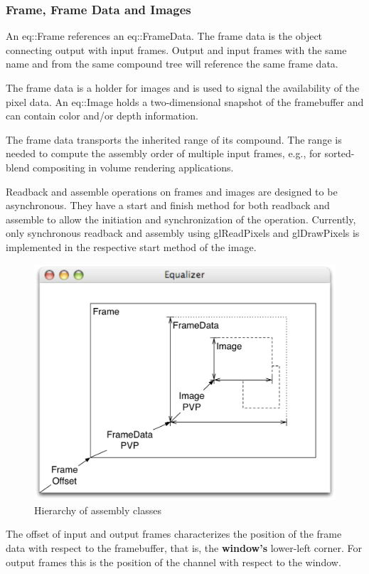 \documentclass[10pt,a4]{scrartcl}
\begin{document}
\subsubsection{Frame, Frame Data and Images}

An \textsf{eq::Frame} references an \textsf{eq::Fra\-me\-Data}. The
frame data is the object connecting output with input frames. Output and
input frames with the same name and from the same compound tree will
reference the same frame data.

The frame data is a holder for images and is used to signal the
availability of the pixel data. An \textsf{eq::Image} holds a
two-dimensional snapshot of the framebuffer and can contain color and/or
depth information.

The frame data transports the inherited range of its compound. The range
is needed to compute the assembly order of multiple input frames, e.g.,
for sorted-blend compositing in volume rendering applications.

Readback and assemble operations on frames and images are designed to be
asynchronous. They have a start and finish method for both readback and
assemble to allow the initiation and synchronization of the operation.
Currently, only synchronous readback and assembly using
\textsf{glReadPixels} and \textsf{glDrawPixels} is implemented in the
respective start method of the image.

\begin{figure}
  \includegraphics[width=.6\textwidth]{images/assembly.pdf}
  {\caption{\small\label{fAssembly}Hierarchy of assembly classes}}
\end{figure}
The offset of input and output frames characterizes the position of the
frame data with respect to the framebuffer, that is, the
\textbf{window's} lower-left corner. For output frames this is the
position of the channel with respect to the window.
\end{document}
